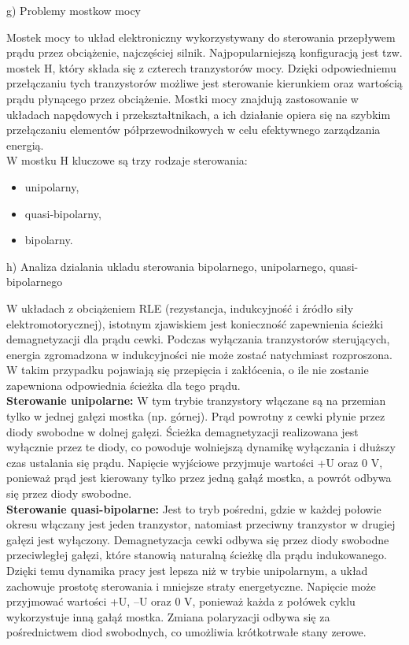 \documentclass[11pt]{article}
\begin{document}
g) Problemy mostkow mocy

Mostek mocy to układ elektroniczny wykorzystywany do sterowania przepływem prądu przez obciążenie, najczęściej silnik. Najpopularniejszą konfiguracją jest tzw. mostek H, który składa się z czterech tranzystorów mocy. Dzięki odpowiedniemu przełączaniu tych tranzystorów możliwe jest sterowanie kierunkiem oraz wartością prądu płynącego przez obciążenie. Mostki mocy znajdują zastosowanie w układach napędowych i przekształtnikach, a ich działanie opiera się na szybkim przełączaniu elementów półprzewodnikowych w celu efektywnego zarządzania energią.\\

W mostku H kluczowe są trzy rodzaje sterowania:
\begin{itemize}
\item unipolarny,
\item quasi-bipolarny,
\item bipolarny.
\end{itemize}
\vspace{1em}

h) Analiza dzialania ukladu sterowania bipolarnego, unipolarnego, quasi-bipolarnego

W układach z obciążeniem RLE (rezystancja, indukcyjność i źródło siły elektromotorycznej), istotnym zjawiskiem jest konieczność zapewnienia ścieżki demagnetyzacji dla prądu cewki. Podczas wyłączania tranzystorów sterujących, energia zgromadzona w indukcyjności nie może zostać natychmiast rozproszona. W takim przypadku pojawiają się przepięcia i zakłócenia, o ile nie zostanie zapewniona odpowiednia ścieżka dla tego prądu.\\

\textbf{Sterowanie unipolarne:}
W tym trybie tranzystory włączane są na przemian tylko w jednej gałęzi mostka (np. górnej). Prąd powrotny z cewki płynie przez diody swobodne w dolnej gałęzi. Ścieżka demagnetyzacji realizowana jest wyłącznie przez te diody, co powoduje wolniejszą dynamikę wyłączania i dłuższy czas ustalania się prądu.
Napięcie wyjściowe przyjmuje wartości +U oraz 0 V, ponieważ prąd jest kierowany tylko przez jedną gałąź mostka, a powrót odbywa się przez diody swobodne.\\

\textbf{Sterowanie quasi-bipolarne:}
Jest to tryb pośredni, gdzie w każdej połowie okresu włączany jest jeden tranzystor, natomiast przeciwny tranzystor w drugiej gałęzi jest wyłączony. Demagnetyzacja cewki odbywa się przez diody swobodne przeciwległej gałęzi, które stanowią naturalną ścieżkę dla prądu indukowanego. Dzięki temu dynamika pracy jest lepsza niż w trybie unipolarnym, a układ zachowuje prostotę sterowania i mniejsze straty energetyczne.
Napięcie może przyjmować wartości +U, –U oraz 0 V, ponieważ każda z połówek cyklu wykorzystuje inną gałąź mostka. Zmiana polaryzacji odbywa się za pośrednictwem diod swobodnych, co umożliwia krótkotrwałe stany zerowe.\\
\end{document}
